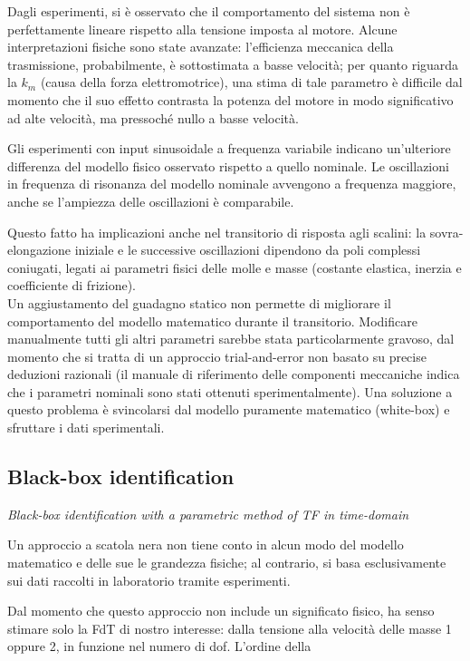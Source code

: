Dagli esperimenti, si è osservato che il comportamento del sistema non è perfettamente lineare rispetto alla tensione imposta al motore. Alcune interpretazioni fisiche sono state avanzate: l'efficienza meccanica della trasmissione, probabilmente, è sottostimata a basse velocità; per quanto riguarda la $k_m$ (causa della forza elettromotrice), una stima di tale parametro è difficile dal momento che il suo effetto contrasta la potenza del motore in modo significativo ad alte velocità, ma pressoché nullo a basse velocità.

Gli esperimenti con input sinusoidale a frequenza variabile indicano un'ulteriore differenza del modello fisico osservato rispetto a quello nominale. Le oscillazioni in frequenza di risonanza del modello nominale avvengono a frequenza maggiore, anche se l'ampiezza delle oscillazioni è comparabile.


Questo fatto ha implicazioni anche nel transitorio di risposta agli scalini: la sovra-elongazione iniziale e le successive oscillazioni dipendono da poli complessi coniugati, legati ai parametri fisici delle molle e masse (costante elastica, inerzia e coefficiente di frizione). \\
Un aggiustamento del guadagno statico non permette di migliorare il comportamento del modello matematico durante il transitorio. Modificare manualmente tutti gli altri parametri sarebbe stata particolarmente gravoso, dal momento che si tratta di un approccio trial-and-error non basato su precise deduzioni razionali (il manuale di riferimento delle componenti meccaniche indica che i parametri nominali sono stati ottenuti sperimentalmente).
Una soluzione a questo problema è svincolarsi dal modello puramente matematico (white-box) e sfruttare i dati sperimentali.


\subsection{Black-box identification}

\textit{Black-box identification with a parametric method of TF in time-domain}
\\ \par Un approccio a scatola nera non tiene conto in alcun modo del modello matematico e delle sue le grandezza fisiche; al contrario, si basa esclusivamente sui dati raccolti in laboratorio tramite esperimenti.


Dal momento che questo approccio non include un significato fisico, ha senso stimare solo la FdT di nostro interesse: dalla tensione alla velocità delle masse 1 oppure 2, in funzione nel numero di dof. 
L'ordine della 





